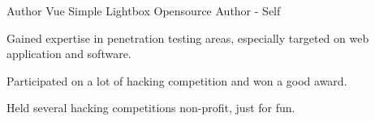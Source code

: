 \begin{cventries}
  \cventry
    {Author} %
    {Vue Simple Lightbox} %
    {Opensource} %
    {Author - Self} %
    {
      \begin{cvitems} %
        \item {Gained expertise in penetration testing areas, especially targeted on web application and software.}
        \item {Participated on a lot of hacking competition and won a good award.}
        \item {Held several hacking competitions non-profit, just for fun.}
      \end{cvitems}
    }
\end{cventries}
